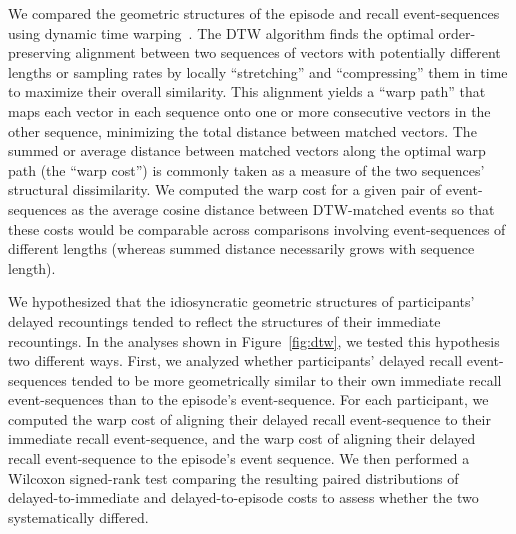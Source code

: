 \documentclass[10pt]{article}
\begin{document}
We compared the geometric structures of the episode and recall event-sequences using dynamic time warping~\citep[DTW;][]{Vint68,SakoChib78}.
The DTW algorithm finds the optimal order-preserving alignment between two sequences of vectors with potentially different lengths or sampling rates by locally ``stretching'' and ``compressing'' them in time to maximize their overall similarity.
This alignment yields a ``warp path'' that maps each vector in each sequence onto one or more consecutive vectors in the other sequence, minimizing the total distance between matched vectors.
The summed or average distance between matched vectors along the optimal warp path (the ``warp cost'') is commonly taken as a measure of the two sequences' structural dissimilarity.
We computed the warp cost for a given pair of event-sequences as the average cosine distance between DTW-matched events so that these costs would be comparable across comparisons involving event-sequences of different lengths (whereas summed distance necessarily grows with sequence length).

We hypothesized that the idiosyncratic geometric structures of participants' delayed recountings tended to reflect the structures of their immediate recountings.
In the analyses shown in Figure~\ref{fig:dtw}, we tested this hypothesis two different ways.
First, we analyzed whether participants' delayed recall event-sequences tended to be more geometrically similar to their own immediate recall event-sequences than to the episode's event-sequence.
For each participant, we computed the warp cost of aligning their delayed recall event-sequence to their immediate recall event-sequence, and the warp cost of aligning their delayed recall event-sequence to the episode's event sequence.
We then performed a Wilcoxon signed-rank test comparing the resulting paired distributions of delayed-to-immediate and delayed-to-episode costs to assess whether the two systematically differed.
\end{document}
